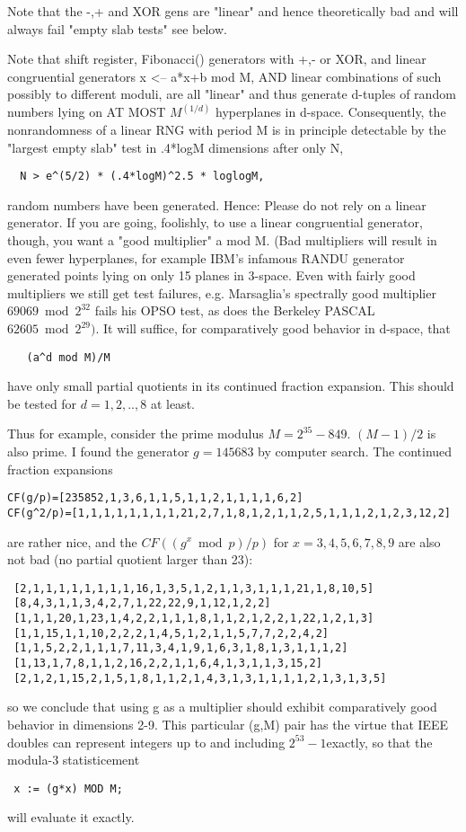 Note that the -,+ and XOR gens are "linear" and hence theoretically
bad and will always fail "empty slab tests" see below.

Note that shift register, Fibonacci() generators with +,- or XOR,
and linear congruential generators x <-- a*x+b mod M, AND linear
combinations of such possibly to different moduli, are all
"linear" and thus generate d-tuples of random numbers lying on
AT MOST $M^{(1/d)}$ hyperplanes in d-space. Consequently,
the nonrandomness of a linear RNG with period M is in principle
detectable by the "largest empty slab" test in .4*logM dimensions
after only N,
\begin{verbatim}
  N > e^(5/2) * (.4*logM)^2.5 * loglogM,
\end{verbatim}
random numbers have been generated. Hence:
Please do not rely on a linear generator.
If you are going, foolishly, to use a linear congruential generator, though,
you want a "good multiplier" a mod M. (Bad multipliers
will result in even fewer hyperplanes, for example IBM's
infamous RANDU generator generated points lying on only 15 planes in 3-space.
Even with fairly good multipliers we still get test failures, e.g. Marsaglia's
spectrally good multiplier $69069 \bmod 2^{32}$ fails his OPSO test, as does
the Berkeley PASCAL $62605 \bmod 2^{29})$. It will suffice, for
comparatively good behavior in d-space, that
\begin{verbatim}
   (a^d mod M)/M
\end{verbatim}
have only small partial quotients in its continued fraction expansion.
This should be tested for $d=1,2,..,8$ at least.

Thus for example, consider the prime modulus $M=2^{35} - 849$.
$(M-1)/2$ is also prime. I found the generator $g=145683$ by computer
search. The continued fraction expansions
\begin{verbatim}
CF(g/p)=[235852,1,3,6,1,1,5,1,1,2,1,1,1,1,6,2]
CF(g^2/p)=[1,1,1,1,1,1,1,1,21,2,7,1,8,1,2,1,1,2,5,1,1,1,2,1,2,3,12,2]
\end{verbatim}
are rather nice, and the $CF( (g^x \bmod p)/p )$ for $x=3,4,5,6,7,8,9$ are
also not bad (no partial quotient larger than 23):
\begin{verbatim}
 [2,1,1,1,1,1,1,1,1,16,1,3,5,1,2,1,1,3,1,1,1,21,1,8,10,5]
 [8,4,3,1,1,3,4,2,7,1,22,22,9,1,12,1,2,2]
 [1,1,1,20,1,23,1,4,2,2,1,1,1,8,1,1,2,1,2,2,1,22,1,2,1,3]
 [1,1,15,1,1,10,2,2,2,1,4,5,1,2,1,1,5,7,7,2,2,4,2]
 [1,1,5,2,2,1,1,1,7,11,3,4,1,9,1,6,3,1,8,1,3,1,1,1,2]
 [1,13,1,7,8,1,1,2,16,2,2,1,1,6,4,1,3,1,1,3,15,2]
 [2,1,2,1,15,2,1,5,1,8,1,1,2,1,4,3,1,3,1,1,1,1,2,1,3,1,3,5]
\end{verbatim}
so we conclude that using g as a multiplier should exhibit comparatively
good behavior in dimensions 2-9. This particular (g,M) pair
has the virtue that IEEE doubles can represent integers up to and including
$2^{53} - 1 $exactly, so that the modula-3 statisticement
\begin{verbatim} x := (g*x) MOD M; \end{verbatim}
will evaluate it exactly.

